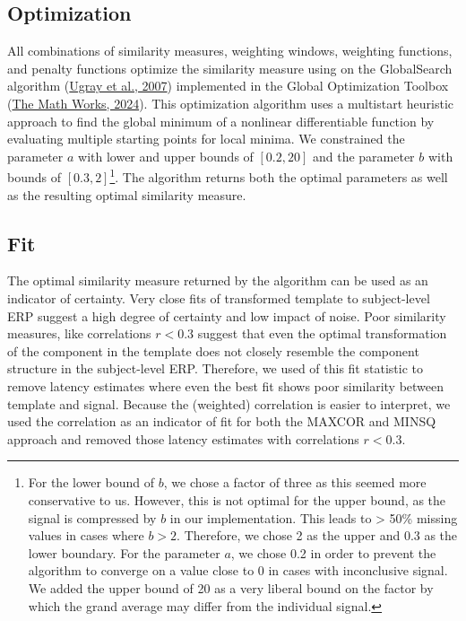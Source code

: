 \documentclass[
  man]{apa7}
\begin{document}
\hypertarget{optimization}{%
\subsection{Optimization}\label{optimization}}

All combinations of similarity measures, weighting windows, weighting functions, and penalty functions optimize the similarity measure using on the GlobalSearch algorithm (\protect\hyperlink{ref-ugray2007scatter}{Ugray et al., 2007}) implemented in the Global Optimization Toolbox (\protect\hyperlink{ref-matlab2024a}{The Math Works, 2024}). This optimization algorithm uses a multistart heuristic approach to find the global minimum of a nonlinear differentiable function by evaluating multiple starting points for local minima. We constrained the parameter \(a\) with lower and upper bounds of \([0.2, 20]\) and the parameter \(b\) with bounds of \([0.3, 2]\)\footnote{For the lower bound of \(b\), we chose a factor of three as this seemed more conservative to us. However, this is not optimal for the upper bound, as the signal is compressed by \(b\) in our implementation. This leads to \textgreater{} 50\% missing values in cases where \(b > 2\). Therefore, we chose 2 as the upper and 0.3 as the lower boundary. For the parameter \(a\), we chose 0.2 in order to prevent the algorithm to converge on a value close to 0 in cases with inconclusive signal. We added the upper bound of 20 as a very liberal bound on the factor by which the grand average may differ from the individual signal.}. The algorithm returns both the optimal parameters as well as the resulting optimal similarity measure.

\hypertarget{fit}{%
\subsection{Fit}\label{fit}}

The optimal similarity measure returned by the algorithm can be used as an indicator of certainty. Very close fits of transformed template to subject-level ERP suggest a high degree of certainty and low impact of noise. Poor similarity measures, like correlations \(r < 0.3\) suggest that even the optimal transformation of the component in the template does not closely resemble the component structure in the subject-level ERP. Therefore, we used of this fit statistic to remove latency estimates where even the best fit shows poor similarity between template and signal. Because the (weighted) correlation is easier to interpret, we used the correlation as an indicator of fit for both the MAXCOR and MINSQ approach and removed those latency estimates with correlations \(r < 0.3\).
\end{document}
